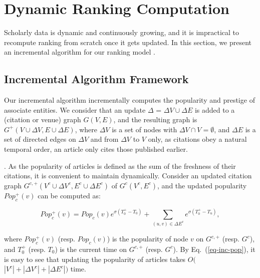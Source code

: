 \section{Dynamic Ranking Computation}
\label{sec-incAlg}

Scholarly data is dynamic and continuously growing, and it is impractical to recompute ranking from scratch once it gets updated. In this section, we present an incremental algorithm for our ranking model \ensemblerank.


\subsection{Incremental Algorithm Framework}
\label{subsec-inc-alg}




Our incremental algorithm \incensemble incrementally computes the popularity and prestige of associate entities.
We consider that an update $\Delta$ = $\Delta V\cup\Delta E$ is added to a (citation or venue) graph $G(V, E)$,
and the resulting graph is $G^+(V\cup\Delta V, E\cup\Delta E)$, where
$\Delta V$ is a set of nodes with $\Delta V\cap V = \emptyset$, and $\Delta E$ is a set of directed edges on $\Delta V$ and from $\Delta V$ to $V$ only, as citations obey a natural temporal order, \ie an article only cites those published earlier. %


.
As the popularity of articles is defined as the sum of the freshness of their citations, it is convenient to maintain dynamically. Consider an updated citation graph $G^{c,+}(V^c\cup\Delta V^c, E^c\cup\Delta E^c)$ of $G^c(V^c, E^c)$, and the updated popularity $Pop_{c}^+(v)$ can be computed as:

\vspace{-1ex}
\begin{small}
\begin{equation}\label{eq-inc-pop}
Pop_c^+(v) = Pop_c(v) {e^{\sigma (T^+_0-T_0)}} + \sum_{(u,v)\in \Delta E^c} {e^{\sigma (T^+_0-T_u)}},
\end{equation}
\end{small}
%
\noindent where $Pop^+_c(v)$ (resp. $Pop_c(v)$) is the popularity of node $v$ on $G^{c,+}$ (resp. $G^c$), and
$T^+_0$ (resp. $T_0$) is the current time on $G^{c,+}$ (resp. $G^c$).
%
By Eq.~(\ref{eq-inc-pop}), it is easy to see that updating the popularity of articles takes $O($ $|V^c|+|\Delta V^c|+|\Delta E^c|)$ time.

